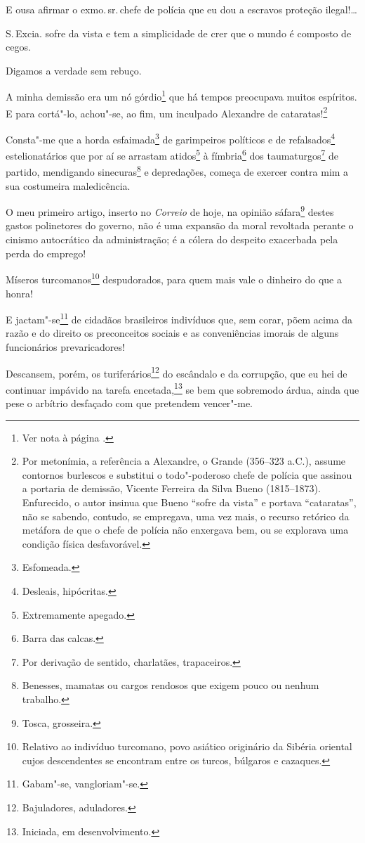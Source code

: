 E ousa afirmar o exmo.\,sr.\,chefe de polícia que eu dou a escravos
proteção ilegal!\ldots{}

S.\,Excia. sofre da vista e tem a simplicidade de crer que o mundo é
composto de cegos.

Digamos a verdade sem rebuço.

A minha demissão era um nó górdio\footnote{Ver nota à página \pageref{gordio}.} que há tempos preocupava muitos
espíritos. E para cortá"-lo, achou"-se, ao fim, um inculpado Alexandre de
cataratas!\footnote{Por metonímia, a referência a Alexandre, o Grande
  (356--323 a.C.), assume contornos burlescos e substitui o todo"-poderoso
  chefe de polícia que assinou a portaria de demissão, Vicente Ferreira
  da Silva Bueno (1815--1873). Enfurecido, o autor insinua que Bueno
  ``sofre da vista'' e portava ``cataratas'', não se sabendo, contudo, se
  empregava, uma vez mais, o recurso retórico da metáfora de que o chefe
  de polícia não enxergava bem, ou se explorava uma condição física
  desfavorável.}

Consta"-me que a horda esfaimada\footnote{Esfomeada.} de garimpeiros
políticos e de refalsados\footnote{Desleais, hipócritas.}
estelionatários que por aí se arrastam atidos\footnote{Extremamente
  apegado.} à fímbria\footnote{Barra das calcas.} dos
taumaturgos\footnote{Por derivação de sentido, charlatães,
  trapaceiros.} de partido, mendigando sinecuras\footnote{Benesses,
  mamatas ou cargos rendosos que exigem pouco ou nenhum trabalho.} e
depredações, começa de exercer contra mim a sua costumeira maledicência.

O meu primeiro artigo, inserto no \emph{Correio} de hoje, na opinião
sáfara\footnote{Tosca, grosseira.} destes gastos polinetores do
governo, não é uma expansão da moral revoltada perante o cinismo
autocrático da administração; é a cólera do despeito exacerbada pela
perda do emprego!

Míseros turcomanos\footnote{Relativo ao indivíduo turcomano, povo
  asiático originário da Sibéria oriental cujos descendentes se
  encontram entre os turcos, búlgaros e cazaques.} despudorados, para
quem mais vale o dinheiro do que a honra!

E jactam"-se\footnote{Gabam"-se, vangloriam"-se.} de cidadãos brasileiros
indivíduos que, sem corar, põem acima da razão e do direito os
preconceitos sociais e as conveniências imorais de alguns funcionários
prevaricadores!

Descansem, porém, os turiferários\footnote{Bajuladores, aduladores.}
do escândalo e da corrupção, que eu hei de continuar impávido na tarefa
encetada,\footnote{Iniciada, em desenvolvimento.} se bem que sobremodo
árdua, ainda que pese o arbítrio desfaçado com que pretendem vencer"-me.


